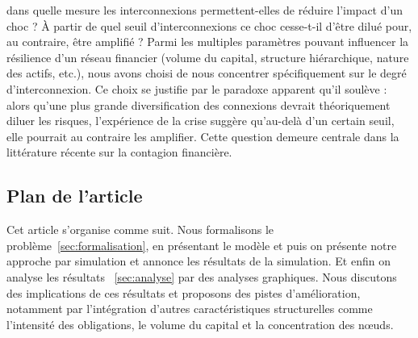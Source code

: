 dans quelle mesure les interconnexions permettent-elles de réduire l'impact d'un choc ?
À partir de quel seuil d'interconnexions ce choc cesse-t-il d'être dilué pour, au contraire, être amplifié ?
Parmi les multiples paramètres pouvant influencer la résilience d'un réseau financier
(volume du capital, structure hiérarchique, nature des actifs, etc.),
nous avons choisi de nous concentrer spécifiquement sur le degré d'interconnexion.
Ce choix se justifie par le paradoxe apparent qu'il soulève : alors qu'une plus grande diversification
des connexions devrait théoriquement diluer les risques,
l'expérience de la crise suggère qu'au-delà d'un certain seuil, elle pourrait au contraire les amplifier.
Cette question demeure centrale dans la littérature récente sur la contagion financière.


\subsection{Plan de l'article}
Cet article s'organise comme suit.
Nous formalisons le problème~\ref{sec:formalisation}, en présentant le modèle et puis on présente notre approche par simulation et annonce les résultats de la simulation.
Et enfin on analyse les résultats ~\ref{sec:analyse} par des analyses graphiques.
Nous discutons des implications de ces résultats et proposons
des pistes d'amélioration, notamment par l'intégration d'autres caractéristiques structurelles
comme l'intensité des obligations, le volume du capital et la concentration des nœuds.



